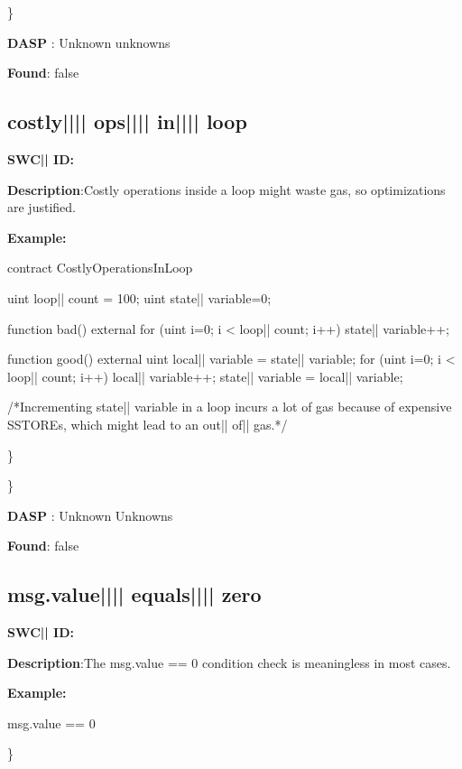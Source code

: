 \documentclass{article}
\begin{document}
\} 

\textbf{DASP} : Unknown unknowns

\textbf{Found}: false

\subsection{costly{||\textunderscore|| }ops{||\textunderscore|| }in{||\textunderscore|| }loop} 
\textbf{SWC{|\textunderscore| }ID:} 

\textbf{Description}:Costly operations inside a loop might waste gas, so optimizations are justified.


\textbf{Example:} 
\begin{ffcode} 

contract CostlyOperationsInLoop{

    uint loop|\textunderscore| count = 100;
    uint state|\textunderscore| variable=0;

    function bad() external{
        for (uint i=0; i < loop|\textunderscore| count; i++){
            state|\textunderscore| variable++;
        }
    }

    function good() external{
      uint local|\textunderscore| variable = state|\textunderscore| variable;
      for (uint i=0; i < loop|\textunderscore| count; i++){
        local|\textunderscore| variable++;
      }
      state|\textunderscore| variable = local|\textunderscore| variable;
    }
}
 /*Incrementing state|\textunderscore| variable in a loop incurs a lot of gas because of expensive SSTOREs, which might lead to an out|\textendash| of|\textendash| gas.*/ 

\end{ffcode} 
\} 

\} 

\textbf{DASP} : Unknown Unknowns

\textbf{Found}: false

\subsection{msg.value{||\textunderscore|| }equals{||\textunderscore|| }zero} 
\textbf{SWC{|\textunderscore| }ID:} 

\textbf{Description}:The msg.value == 0 condition check is meaningless in most cases.


\textbf{Example:} 
\begin{ffcode} 

msg.value == 0

\end{ffcode} 
\} 
\end{document}
